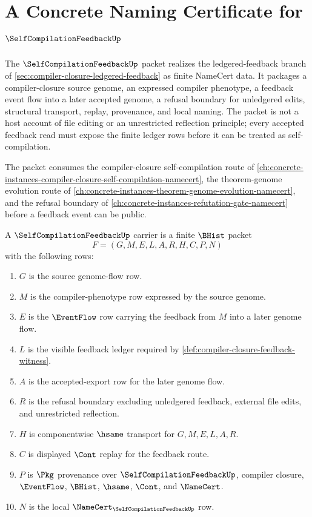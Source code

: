 \chapter{A Concrete Naming Certificate for $\SelfCompilationFeedbackUp$}
\label{ch:concrete-instances-self-compilation-feedback-namecert}

The $\SelfCompilationFeedbackUp$ packet realizes the ledgered-feedback branch of \autoref{sec:compiler-closure-ledgered-feedback} as finite NameCert data. It packages a compiler-closure source genome, an expressed compiler phenotype, a feedback event flow into a later accepted genome, a refusal boundary for unledgered edits, structural transport, replay, provenance, and local naming. The packet is not a host account of file editing or an unrestricted reflection principle; every accepted feedback read must expose the finite ledger rows before it can be treated as self-compilation.

The packet consumes the compiler-closure self-compilation route of \autoref{ch:concrete-instances-compiler-closure-self-compilation-namecert}, the theorem-genome evolution route of \autoref{ch:concrete-instances-theorem-genome-evolution-namecert}, and the refusal boundary of \autoref{ch:concrete-instances-refutation-gate-namecert} before a feedback event can be public.

\begin{definition}
\label{def:self-compilation-feedback-carrier}
A $\SelfCompilationFeedbackUp$ carrier is a finite $\BHist$ packet
$$
F=(G,M,E,L,A,R,H,C,P,N)
$$
with the following rows:
\begin{enumerate}
\item $G$ is the source genome-flow row.
\item $M$ is the compiler-phenotype row expressed by the source genome.
\item $E$ is the $\EventFlow$ row carrying the feedback from $M$ into a later genome flow.
\item $L$ is the visible feedback ledger required by \autoref{def:compiler-closure-feedback-witness}.
\item $A$ is the accepted-export row for the later genome flow.
\item $R$ is the refusal boundary excluding unledgered feedback, external file edits, and unrestricted reflection.
\item $H$ is componentwise $\hsame$ transport for $G,M,E,L,A,R$.
\item $C$ is displayed $\Cont$ replay for the feedback route.
\item $P$ is $\Pkg$ provenance over $\SelfCompilationFeedbackUp$, compiler closure, $\EventFlow$, $\BHist$, $\hsame$, $\Cont$, and $\NameCert$.
\item $N$ is the local $\NameCert_{\SelfCompilationFeedbackUp}$ row.
\end{enumerate}
\end{definition}

